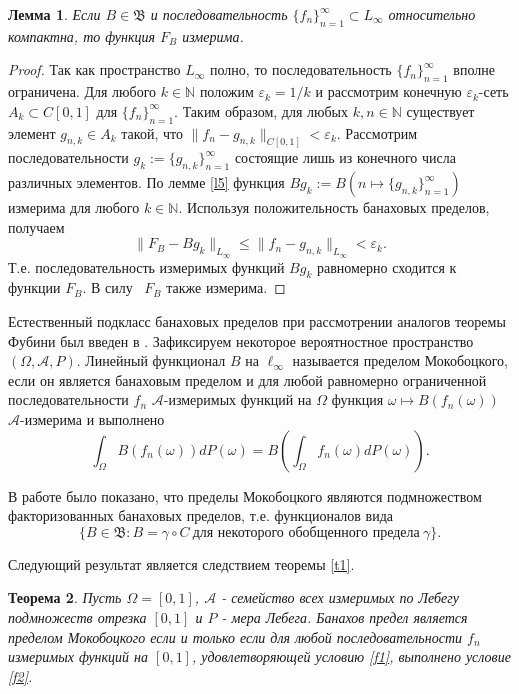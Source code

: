 \documentclass[12pt]{article}
\newtheorem{thm}{Теорема}
\newtheorem{lem}[thm]{Лемма}
\def\N{{\mathbb{N}}}
\def\B{{\mathfrak{B}}}
\begin{document}
\begin{lem}\label{l6}
Если $B\in \B$ и последовательность $\{f_n\}_{n=1}^\infty \subset L_\infty$  относительно компактна, то функция $F_B$ измерима.
\end{lem}

\begin{proof}
Так как пространство $L_\infty$ полно, то последовательность $\{f_n\}_{n=1}^\infty$ вполне ограничена. Для любого $k\in\N$ положим $\varepsilon_k=1/k$ и рассмотрим конечную $\varepsilon_k$-сеть $A_k\subset C[0,1]$ для $\{f_n\}_{n=1}^\infty$. Таким образом, для любых $k, n\in\N$ существует элемент $g_{n,k}\in A_k$ такой, что $\|f_n-g_{n,k}\|_{C[0,1]}<\varepsilon_k.$ Рассмотрим последовательности $g_k:=\{g_{n,k}\}_{n=1}^\infty$ состоящие лишь из конечного числа различных  элементов. По лемме \ref{l5} функция $Bg_k:= B(n\mapsto \{g_{n,k}\}_{n=1}^\infty)$ измерима для любого $k\in \N.$ Используя положительность банаховых пределов, получаем
$$\|F_B-Bg_{k}\|_{L_\infty}\le\|f_n-g_{n,k}\|_{L_\infty}<\varepsilon_k.$$
Т.е. последовательность измеримых функций $Bg_k$ равномерно сходится к функции $F_B$. В силу~\cite{NatansonTF} $F_B$ также измерима.
\end{proof}

Естественный подкласс банаховых пределов при рассмотрении аналогов теоремы Фубини был введен в \cite{Mokobodzki}.
Зафиксируем некоторое вероятностное пространство $(\Omega, \mathcal A, P)$. Линейный функционал $B$ на $\ell_\infty$ называется пределом Мокобоцкого, если он является банаховым пределом и для любой равномерно ограниченной последовательности $f_n$  $\mathcal A$-измеримых функций на $\Omega$ функция $\omega \mapsto B(f_n(\omega))$ $\mathcal A$-измерима и выполнено
\begin{equation}\label{Fubini1}
\int_\Omega B(f_n(\omega)) dP(\omega) = B\left(\int_\Omega f_n(\omega) dP(\omega)\right).
 \end{equation}

 В работе \cite{Bjorklund} было показано, что пределы Мокобоцкого являются подмножеством факторизованных банаховых пределов, т.е. функционалов вида
$$\{ B\in \B : B=\gamma \circ C \ \text{для некоторого обобщенного предела} \ \gamma\}.$$

Следующий результат является следствием теоремы \ref{t1}.

\begin{thm}
Пусть $\Omega=[0,1]$, $\mathcal A$ - семейство всех измеримых по Лебегу подмножеств отрезка $[0,1]$ и $P$ - мера Лебега. Банахов предел является пределом Мокобоцкого если и только если для любой последовательности $f_n$  измеримых функций на $[0,1]$,  удовлетворяющей условию \eqref{f1}, выполнено условие \eqref{f2}.
\end{thm}
\end{document}
